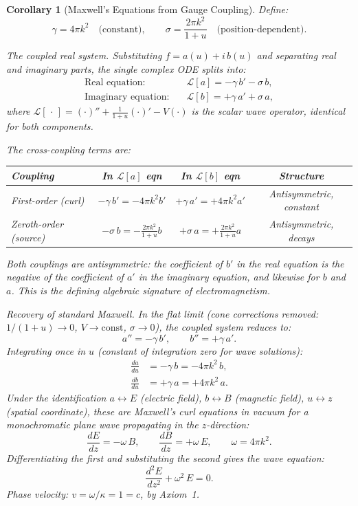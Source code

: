\documentclass[12pt]{amsart}
\newtheorem{corollary}{Corollary}
\begin{document}
\begin{corollary}[Maxwell's Equations from Gauge Coupling]
Define:
\[
  \gamma = 4\pi k^2 \quad \text{(constant)}, \qquad
  \sigma = \frac{2\pi k^2}{1+u} \quad \text{(position-dependent)}.
\]

\textit{The coupled real system.} Substituting $f = a(u) + i\, b(u)$ and separating real and
imaginary parts, the single complex ODE splits into:
\begin{align*}
  \text{Real equation:} &\quad \mathcal{L}[a] = -\gamma\, b' - \sigma\, b, \\
  \text{Imaginary equation:} &\quad \mathcal{L}[b] = +\gamma\, a' + \sigma\, a,
\end{align*}
where $\mathcal{L}[\,\cdot\,] = (\cdot)'' + \tfrac{1}{1+u}(\cdot)' - V(\cdot)$ is the scalar
wave operator, identical for both components.

The cross-coupling terms are:

\begin{center}
\begin{tabular}{lccc}
\hline
Coupling & In $\mathcal{L}[a]$ eqn & In $\mathcal{L}[b]$ eqn & Structure \\
\hline
First-order (curl) & $-\gamma\, b' = -4\pi k^2 b'$ & $+\gamma\, a' = +4\pi k^2 a'$
  & Antisymmetric, constant \\
Zeroth-order (source) & $-\sigma\, b = -\frac{2\pi k^2}{1+u} b$
  & $+\sigma\, a = +\frac{2\pi k^2}{1+u} a$ & Antisymmetric, decays \\
\hline
\end{tabular}
\end{center}

Both couplings are antisymmetric: the coefficient of $b'$ in the real equation is the negative
of the coefficient of $a'$ in the imaginary equation, and likewise for $b$ and $a$. This is the
defining algebraic signature of electromagnetism.

\textit{Recovery of standard Maxwell.} In the flat limit (cone corrections removed:
$1/(1+u) \to 0$, $V \to \text{const}$, $\sigma \to 0$), the coupled system reduces to:
\[
  a'' = -\gamma\, b', \qquad b'' = +\gamma\, a'.
\]
Integrating once in $u$ (constant of integration zero for wave solutions):
\begin{align}
  \frac{da}{du} &= -\gamma\, b = -4\pi k^2\, b, \label{eq:maxwell1} \\
  \frac{db}{du} &= +\gamma\, a = +4\pi k^2\, a. \label{eq:maxwell2}
\end{align}
Under the identification $a \leftrightarrow E$ (electric field), $b \leftrightarrow B$
(magnetic field), $u \leftrightarrow z$ (spatial coordinate), these are Maxwell's curl equations
in vacuum for a monochromatic plane wave propagating in the $z$-direction:
\[
  \frac{dE}{dz} = -\omega\, B, \qquad \frac{dB}{dz} = +\omega\, E,
  \qquad \omega = 4\pi k^2.
\]
Differentiating the first and substituting the second gives the wave equation:
\[
  \frac{d^2 E}{dz^2} + \omega^2\, E = 0.
\]
Phase velocity: $v = \omega/\kappa = 1 = c$, by Axiom~1.


\end{corollary}
\end{document}
